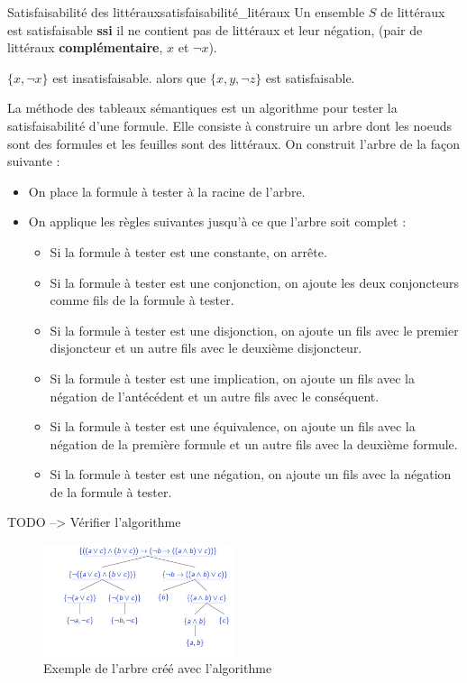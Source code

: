 \begin{theorem}{Satisfaisabilité des littéraux}{satisfaisabilité_litéraux}
  Un ensemble $S$ de littéraux est satisfaisable \textbf{ssi} il ne contient pas de littéraux et leur négation, (pair de littéraux \textbf{complémentaire}, $x$ et $\neg x$).
\end{theorem}
\begin{example}\leavevmode
  $\{x, \neg x\}$ est insatisfaisable. alors que $\{x, y, \neg z\}$ est satisfaisable.
\end{example}
La méthode des tableaux sémantiques est un algorithme pour tester la satisfaisabilité d'une formule. Elle consiste à construire un arbre dont les noeuds sont des formules et les feuilles sont des littéraux. On construit l'arbre de la façon suivante :
\begin{itemize}[label=$\bullet$]
  \item On place la formule à tester à la racine de l'arbre.
  \item On applique les règles suivantes jusqu'à ce que l'arbre soit complet :
  \begin{itemize}[label=$\circ$]
    \item Si la formule à tester est une constante, on arrête.
    \item Si la formule à tester est une conjonction, on ajoute les deux conjoncteurs comme fils de la formule à tester.
    \item Si la formule à tester est une disjonction, on ajoute un fils avec le premier disjoncteur et un autre fils avec le deuxième disjoncteur.
    \item Si la formule à tester est une implication, on ajoute un fils avec la négation de l'antécédent et un autre fils avec le conséquent.
    \item Si la formule à tester est une équivalence, on ajoute un fils avec la négation de la première formule et un autre fils avec la deuxième formule.
    \item Si la formule à tester est une négation, on ajoute un fils avec la négation de la formule à tester.
  \end{itemize}
\end{itemize}
\begin{remark}
  TODO --> Vérifier l'algorithme
\end{remark}
\begin{figure}[H]
  \begin{center}
    \includegraphics[width=0.5\textwidth]{pictures/tableausem.png}
  \end{center}
  \caption{Exemple de l'arbre créé avec l'algorithme}\label{fig:tableausem}
\end{figure}

